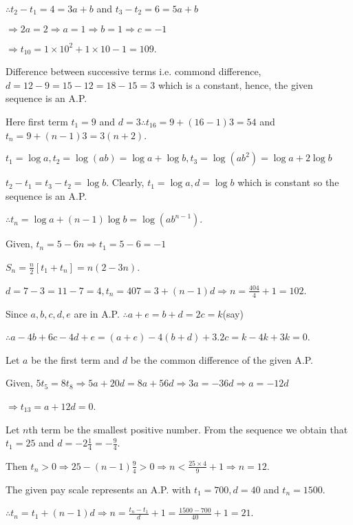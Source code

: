   $\therefore t_2 - t_1 = 4 = 3a + b$ and $t_3 - t_2 = 6 = 5a + b$

  $\Rightarrow 2a = 2 \Rightarrow a = 1 \Rightarrow b = 1 \Rightarrow c = -1$

  $\Rightarrow t_{10} = 1\times10^2 + 1\times10 - 1 = 109$.
\item Difference between successive terms i.e. commond difference, $d = 12 - 9 = 15 - 12 = 18 - 15 = 3$ which is a constant, hence,
  the given sequence is an A.P.

  Here first term $t_1 = 9$ and $d = 3 \therefore t_{16} = 9 + (16 - 1)3 = 54$ and $t_n = 9 + (n - 1)3 = 3(n + 2)$.
\item $t_1 = \log a, t_2 = \log(ab) = \log a + \log b, t_3 = \log(ab^2) = \log a + 2\log b$

  $t_2 - t_1 = t_3 - t_2 = \log b$. Clearly, $t_1 = \log a, d = \log b$ which is constant so the sequence is an A.P.

  $\therefore t_n = \log a + (n - 1)\log b = \log(ab^{n - 1})$.
\item Given, $t_n = 5 - 6n \Rightarrow t_1 = 5 - 6 = -1$

  $S_n = \frac{n}{2}[t_1 + t_n] = n(2 - 3n)$.
\item $d = 7 - 3 = 11 -7 = 4, t_n = 407 = 3 + (n - 1)d \Rightarrow n = \frac{404}{4} + 1 = 102$.
\item Since $a, b, c, d, e$ are in A.P. $\therefore a + e = b + d = 2c = k$(say)

  $\therefore a - 4b + 6c - 4d + e = (a + e) - 4(b + d) + 3.2c = k - 4k + 3k = 0$.
\item Let $a$ be the first term and $d$ be the common difference of the given A.P.

  Given, $5t_5 = 8t_8 \Rightarrow 5a + 20d = 8a + 56d \Rightarrow 3a = -36d \Rightarrow a = -12d$

  $\Rightarrow t_{13} = a + 12d = 0$.
\item Let $n$th term be the smallest positive number. From the sequence we obtain that $t_1 = 25$ and $d = -2\frac{1}{4} = -\frac{9}{4}$.

  Then $t_n > 0 \Rightarrow 25 - (n - 1)\frac{9}{4} > 0\Rightarrow n < \frac{25\times4}{9} + 1 \Rightarrow n = 12$.
\item The given pay scale represents an A.P. with $t_1 = 700, d = 40$ and $t_n = 1500$.

  $\therefore t_n = t_1 + (n - 1)d \Rightarrow n = \frac{t_n - t_1}{d} + 1 = \frac{1500 - 700}{40} + 1 = 21$.

